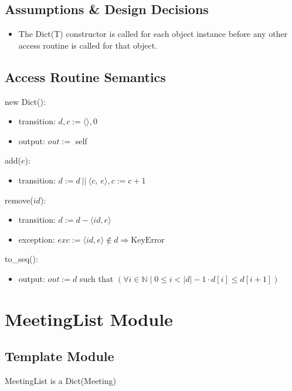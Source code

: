\documentclass[12pt, titlepage]{article}
\begin{document}
\subsection*{Assumptions \& Design Decisions}
\begin{itemize}
  \item The Dict(T) constructor is called for each object instance before any other access routine is called for that object.
\end{itemize}

\subsection*{Access Routine Semantics}
\noindent new Dict():
\begin{itemize}
    \item transition: $d, c := \langle \rangle, 0$
    
    \item output: $out :=$ self
\end{itemize}

\noindent add($e$):
\begin{itemize}
    \item transition: $d :=  d\ ||\ \langle c,\ e \rangle, c := c + 1$
\end{itemize}

\noindent remove($id$):
\begin{itemize}
    \item transition: $d :=  d - \langle id, e \rangle$
    \item exception: $exc := \langle id, e \rangle \notin d \Rightarrow \text{KeyError}$
\end{itemize}

\noindent to\_seq():
\begin{itemize}
    \item output: $out := d$ such that $(\forall i \in \mathbb{N} \mid 0 \leq i < |d| - 1 \cdot d[i] \leq d[i + 1] )$
\end{itemize}

\newpage
\section* {MeetingList Module}

\subsection*{Template Module}
MeetingList is a Dict(Meeting)
\end{document}
